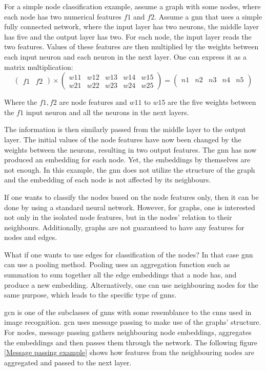 For a simple node classification example, assume a graph with some nodes, where each node has two numerical features $f1$ and $f2$. Assume a \gls{gnn} that uses a simple fully connected network, where the input layer has two neurons, the middle layer has five and the output layer has two. For each node, the input layer reads the two features. Values of these features are then multiplied by the weights between each input neuron and each neuron in the next layer. One can express it as a matrix multiplication: 
$$
\begin{pmatrix}
f1 & f2 
\end{pmatrix}	
\times
\begin{pmatrix}
w11 & w12 & w13 & w14 & w15 \\
w21 & w22 & w23 & w24 & w25
\end{pmatrix}	
=
\begin{pmatrix}
n1 & n2 & n3 & n4 & n5 \\
\end{pmatrix}	
$$

Where the $f1, f2$ are node features and $w11$ to $w15$ are the five weights between the $f1$ input neuron and all the neurons in the next layers.

The information is then similarly passed from the middle layer to the output layer. The initial values of the node features have now been changed by the weights between the neurons, resulting in two output features. The \gls{gnn} has now produced an embedding for each node. Yet, the embeddings by themselves are not enough. In this example, the \gls{gnn} does not utilize the structure of the graph and the embedding of each node is not affected by its neighbours. 

If one wants to classify the nodes based on the node features only, then it can be done by using a standard neural network. However, for graphs, one is interested not only in the isolated node features, but in the nodes' relation to their neighbours. Additionally, graphs are not guaranteed to have any features for nodes and edges. 

What if one wants to use edges for classification of the nodes? In that case \gls{gnn} can use a pooling method. Pooling uses an aggregation function such as summation to sum together all the edge embeddings that a node has, and produce a new embedding. Alternatively, one can use neighbouring nodes for the same purpose, which leads to the specific type of \gls{gnn}s.

\gls{gcn} is one of the subclasses of \gls{gnn}s with some resemblance to the \gls{cnn}s used in image recognition. \gls{gcn} uses message passing to make use of the graphs' structure. For nodes, message passing gathers neighbouring node embeddings, aggregates the embeddings and then passes them through the network. The following figure \ref{Message passing example} shows how features from the neighbouring nodes are aggregated and passed to the next layer.

